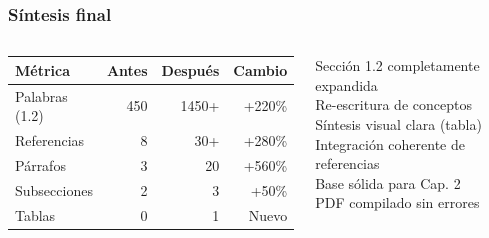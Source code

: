 \documentclass[11pt, aspectratio=169, spanish]{beamer}
\newcommand{\semOK}{\textcolor{VerdeOk}{\faCheckCircle}}
\begin{document}
\begin{frame}[plain, shrink=18]
\frametitle{\faCheckCircle\quad Síntesis final}
\vspace{0.08cm}

\begin{columns}[T]

\begin{tcolorbox}[colback=VerdeUNAL!8, colframe=VerdeUNAL!70, arc=2mm,
  title={\footnotesize\textbf{\faChartBar\quad Comparativa cuantitativa}}]
\footnotesize
\begin{tabular}{|l|r|r|r|}
\hline
\textbf{Métrica} & \textbf{Antes} & \textbf{Después} & \textbf{Cambio} \\
\hline
Palabras (1.2) & 450 & 1450+ & +220\% \\
\hline
Referencias & 8 & 30+ & +280\% \\
\hline
Párrafos & 3 & 20 & +560\% \\
\hline
Subsecciones & 2 & 3 & +50\% \\
\hline
Tablas & 0 & 1 & Nuevo \\
\hline
\end{tabular}
\end{tcolorbox}


\begin{tcolorbox}[colback=VerdeOk!8, colframe=VerdeOk!70, arc=2mm,
  title={\footnotesize\textbf{\faCheckCircle\quad Conseguido}}]
{\scriptsize
\semOK\; Sección 1.2 completamente expandida\\[0.08cm]
\semOK\; Re-escritura de conceptos\\[0.08cm]
\semOK\; Síntesis visual clara (tabla)\\[0.08cm]
\semOK\; Integración coherente de referencias\\[0.08cm]
\semOK\; Base sólida para Cap. 2\\[0.08cm]
\semOK\; PDF compilado sin errores
}
\end{tcolorbox}

\end{columns}

\vspace{0.12cm}

\begin{tcolorbox}[colback=AzulInfo!5, colframe=AzulInfo!60, arc=2mm, boxrule=0.8pt]
\end{tcolorbox}

\end{frame}
\end{document}
